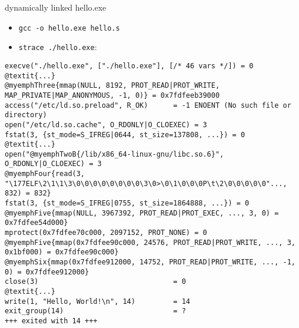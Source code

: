 
\begin{frame}[fragile,label=straceDynamic]{dynamically linked hello.exe}
\begin{itemize}
\item \small{\tt gcc -o hello.exe hello.s}
\item \small{\tt strace ./hello.exe}:
\end{itemize}
\begin{Verbatim}[commandchars=@\{\},fontsize=\fontsize{8}{9}\selectfont]
execve("./hello.exe", ["./hello.exe"], [/* 46 vars */]) = 0
@textit{...}
@myemphThree{mmap(NULL, 8192, PROT_READ|PROT_WRITE, MAP_PRIVATE|MAP_ANONYMOUS, -1, 0)} = 0x7fdfeeb39000
access("/etc/ld.so.preload", R_OK)      = -1 ENOENT (No such file or directory)
open("/etc/ld.so.cache", O_RDONLY|O_CLOEXEC) = 3
fstat(3, {st_mode=S_IFREG|0644, st_size=137808, ...}) = 0
@textit{...}
open("@myemphTwoB{/lib/x86_64-linux-gnu/libc.so.6}", O_RDONLY|O_CLOEXEC) = 3
@myemphFour{read(3, "\177ELF\2\1\1\3\0\0\0\0\0\0\0\0\3\0>\0\1\0\0\0P\t\2\0\0\0\0\0"..., 832) = 832}
fstat(3, {st_mode=S_IFREG|0755, st_size=1864888, ...}) = 0
@myemphFive{mmap(NULL, 3967392, PROT_READ|PROT_EXEC, ..., 3, 0) = 0x7fdfee54d000}
mprotect(0x7fdfee70c000, 2097152, PROT_NONE) = 0
@myemphFive{mmap(0x7fdfee90c000, 24576, PROT_READ|PROT_WRITE, ..., 3, 0x1bf000) = 0x7fdfee90c000}
@myemphSix{mmap(0x7fdfee912000, 14752, PROT_READ|PROT_WRITE, ..., -1, 0) = 0x7fdfee912000}
close(3)                                = 0
@textit{...}
write(1, "Hello, World!\n", 14)         = 14
exit_group(14)                          = ?
+++ exited with 14 +++
\end{Verbatim}
\end{frame}

